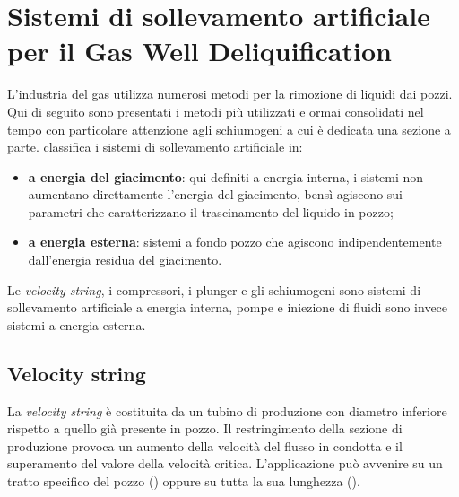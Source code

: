 \section[Sollevamento artificiale per GDW]{Sistemi di sollevamento artificiale per il Gas Well Deliquification}
L'industria del gas utilizza numerosi metodi per la rimozione di liquidi dai pozzi. Qui di seguito sono presentati i metodi più utilizzati e ormai consolidati nel tempo con particolare attenzione agli schiumogeni a cui è dedicata una sezione a parte. \textcite{oyewole2008artificial} classifica i sistemi di sollevamento artificiale in:
\begin{itemize}
    \item \textbf{a energia del giacimento}: qui definiti  a energia interna, i sistemi non aumentano direttamente l'energia del giacimento, bensì agiscono sui parametri che caratterizzano il trascinamento del liquido in pozzo;
    \item \textbf{a energia esterna}: sistemi a fondo pozzo che agiscono indipendentemente dall'energia residua del giacimento.
\end{itemize}
Le \textit{velocity string}, i compressori, i plunger e gli schiumogeni sono sistemi di sollevamento artificiale a energia interna, pompe e iniezione di fluidi sono invece sistemi a energia esterna.

\subsection{Velocity string}
La \textit{velocity string} è costituita da un tubino di produzione con diametro inferiore rispetto a quello già presente in pozzo. Il restringimento della sezione di produzione provoca un aumento della velocità del flusso in condotta e il superamento del valore della velocità critica. L'applicazione può avvenire su un tratto specifico del pozzo () oppure su tutta la sua lunghezza ().

